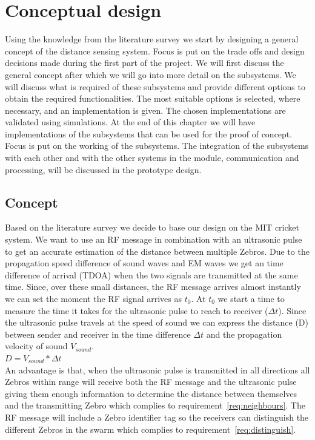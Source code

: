 \chapter{Conceptual design}\label{chap:concept}
Using the knowledge from the literature survey we start by designing a general concept of the distance sensing system. Focus is put on the trade offs and design decisions made during the first part of the project. We will first discuss the general concept after which we will go into more detail on the subsystems. We will discuss what is required of these subsystems and provide different options to obtain the required functionalities. The most suitable options is selected, where necessary, and an implementation is given. The chosen implementations are validated using simulations. At the end of this chapter we will have implementations of the subsystems that can be used for the proof of concept. Focus is put on the working of the subsystems. The integration of the subsystems with each other and with the other systems in the module, communication and processing, will be discussed in the prototype design.

\section{Concept}

Based on the literature survey we decide to base our design on the MIT cricket system. We want to use an RF message in combination with an ultrasonic pulse to get an accurate estimation of the distance between multiple Zebros. Due to the propagation speed difference of sound waves and EM waves we get an time difference of arrival (TDOA) when the two signals are transmitted at the same time. Since, over these small distances, the RF message arrives almost instantly we can set the moment the RF signal arrives as $t_{0}$. At $t_{0}$ we start a time to measure the time it takes for the ultrasonic pulse to reach to receiver ($\Delta t$). Since the ultrasonic pulse travels at the speed of sound we can express the distance (D) between sender and receiver in the time difference $\Delta t$ and the propagation velocity of sound $V_{sound}$.\\

$ D = V_{sound} * \Delta t $\\

An advantage is that, when the ultrasonic pulse is transmitted in all directions all Zebros within range will receive both the RF message and the ultrasonic pulse giving them enough information to determine the distance between themselves and the transmitting Zebro which complies to requirement~\ref{req:neighbours}.
The RF message will include a Zebro identifier tag so the receivers can distinguish the different Zebros in the swarm which complies to requirement~\ref{req:distinguish}.

